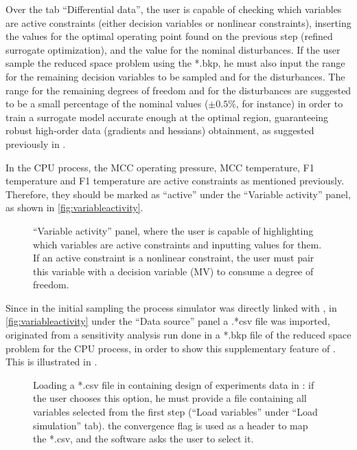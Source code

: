 \documentclass[../../msc-thesis.tex]{subfiles}
\begin{document}
Over the tab ``Differential data'', the user is capable of checking which 
variables are active constraints (either decision variables or nonlinear 
constraints), inserting the values for the optimal operating point found on 
the previous step (refined surrogate optimization), and the value for the 
nominal disturbances. If the user sample the reduced space problem using 
the *.bkp, he must also input the range for the remaining decision variables 
to be sampled and for the disturbances. The range for the remaining degrees 
of freedom and for the disturbances are suggested to be a small percentage 
of the nominal values ($\pm 0.5\%$, for instance) in order to train a surrogate 
model accurate enough at the optimal region, guaranteeing robust high-order 
data (gradients and hessians) obtainment, as suggested previously in 
\textcite{Alves2018}.

In the CPU process, the MCC operating pressure, MCC temperature, F1 
temperature and F1 temperature are active constraints as mentioned previously. 
Therefore, they should be marked as ``active'' under the ``Variable activity'' 
panel, as shown in \autoref{fig:variableactivity}.

\begin{figure}[htb]
	\centering
    \caption{``Variable activity'' panel, where the user is capable of 
    highlighting which variables are active constraints and inputting values 
    for them. If an active constraint is a nonlinear constraint, the user 
    must pair this variable with a decision variable (MV) to consume a 
    degree of freedom.}
	\label{fig:variableactivity}
\end{figure}

Since in the initial sampling the process simulator was directly linked with 
\mtc, in \autoref{fig:variableactivity} under the ``Data source'' panel a 
.*csv file was imported, originated from a sensitivity analysis run done in 
a *.bkp file of the reduced space problem for the CPU process, in order to 
show this supplementary feature of \mtc. This is illustrated in 
.

\begin{figure}[htb]
	\centering
	\caption{Loading a *.csv file in containing design of experiments data in 
    \mtc: if the user chooses this option, he must provide a file containing 
    all variables selected from the first step (``Load variables'' under 
    ``Load simulation'' tab). the convergence flag is used as a header to
	map the *.csv, and the software asks the user to select it.}
	\label{fig:csvload}
\end{figure}
\end{document}
